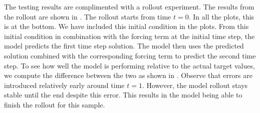 \documentclass[preprint,12pt,times,authoryear]{elsarticle}
\begin{document}
The testing results are complimented with a rollout experiment. The results from the rollout are shown in . The rollout starts from time \(t=0\). In all the plots, this is at the bottom. We have included this initial condition in the plots. From this initial condition in combination with the forcing term at the initial time step, the model predicts the first time step solution. The model then uses the predicted solution combined with the corresponding forcing term to predict the second time step. To see how well the model is performing relative to the actual target values, we compute the difference between the two as shown in . Observe that errors are introduced relatively early around time \(t=1\). However, the model rollout stays stable until the end despite this error. This results in the model being able to finish the rollout for this sample.
\end{document}
